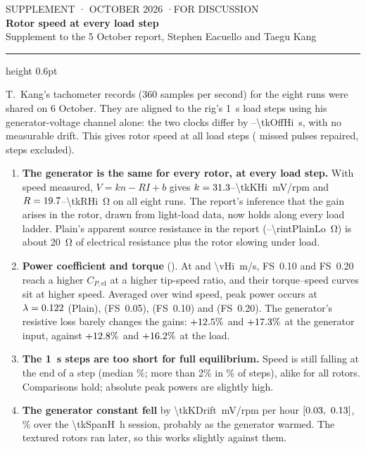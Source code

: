 \documentclass[11pt]{article}
\begin{document}
\thispagestyle{empty}
\begin{flushleft}
{\sffamily\small\color{ink2} SUPPLEMENT \quad· OCTOBER 2026 \quad·\quad FOR DISCUSSION}\\[0.4em]
{\sffamily\Large\bfseries\color{navy} Rotor speed at every load step}\\[0.2em]
{\sffamily\normalsize Supplement to the 5 October report, Stephen Eacuello and Taegu Kang}
\end{flushleft}
\vspace{-0.4em}
{\color{rule}\hrule height 0.6pt}
\vspace{0.4em}

T.~Kang's tachometer records (360 samples per second) for the eight runs were shared on
6 October. They are aligned to the rig's 1~s load steps using his generator-voltage channel alone:
the two clocks differ by \tkOffLo--\SI{\tkOffHi}{s}, with no measurable drift. This gives rotor
speed at all \tkDwells{} load steps (\tkRepairs{} missed pulses repaired, \tkFlagged{} steps excluded).

\begin{enumerate}
  \item \textbf{The generator is the same for every rotor, at every load step.} With speed measured,
        $V=kn-RI+b$ gives $k=31.3$--\SI{\tkKHi}{mV/rpm} and $R=19.7$--\SI{\tkRHi}{\ohm} on all
        eight runs. The report's inference that the gain
        arises in the rotor, drawn from light-load data, now holds along every load ladder. Plain's
        apparent source resistance in the report (\rintPlainHi--\SI{\rintPlainLo}{\ohm}) is about
        \SI{20}{\ohm} of electrical resistance plus the rotor slowing under load.
  \item \textbf{Power coefficient and torque} (). At \tkVmid{} and \SI{\vHi}{m/s},
        FS~0.10 and FS~0.20 reach a higher $C_{P,\mathrm{el}}$ at a higher tip-speed ratio, and
        their torque--speed curves sit at higher speed. Averaged over wind speed, peak power occurs at
        $\lambda=0.122$ (Plain), \tkTsrA{} (FS~0.05), \tkTsrB{} (FS~0.10) and \tkTsrC{}
        (FS~0.20). The generator's resistive loss barely changes the gains:
        $+12.5\%$ and $+17.3\%$ at the generator input, against $+12.8\%$ and $+16.2\%$ at
        the load.
  \item \textbf{The 1~s steps are too short for full equilibrium.} Speed is still falling at the end
        of a step (median \tkSettleMed\%; more than 2\% in \tkSettleTwo\% of steps), alike for all
        rotors. Comparisons hold; absolute peak powers are slightly high.
  \item \textbf{The generator constant fell} by \SI{\tkKDrift}{mV/rpm} per hour
        $[0.03,\ 0.13]$, \tkKDriftPct\% over the \SI{\tkSpanH}{h} session, probably as
        the generator warmed. The textured rotors ran later, so this works slightly against them.
\end{enumerate}
\end{document}
